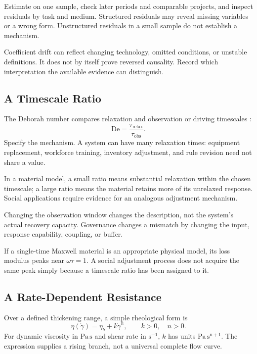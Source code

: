 Estimate on one sample, check later periods and comparable projects, and inspect residuals by task and medium. Structured residuals may reveal missing variables or a wrong form. Unstructured residuals in a small sample do not establish a mechanism.

Coefficient drift can reflect changing technology, omitted conditions, or unstable definitions. It does not by itself prove reversed causality. Record which interpretation the available evidence can distinguish.

\subsection{A Timescale Ratio}

The Deborah number compares relaxation and observation or driving timescales \cite{reiner1964deborah}:
\begin{equation}
 \mathrm{De}=\frac{\tau_{\mathrm{relax}}}
                  {\tau_{\mathrm{obs}}}.
\end{equation}
Specify the mechanism. A system can have many relaxation times: equipment replacement, workforce training, inventory adjustment, and rule revision need not share a value.

In a material model, a small ratio means substantial relaxation within the chosen timescale; a large ratio means the material retains more of its unrelaxed response. Social applications require evidence for an analogous adjustment mechanism.

Changing the observation window changes the description, not the system's actual recovery capacity. Governance changes a mismatch by changing the input, response capability, coupling, or buffer.

If a single-time Maxwell material is an appropriate physical model, its loss modulus peaks near $\omega\tau=1$. A social adjustment process does not acquire the same peak simply because a timescale ratio has been assigned to it.

\subsection{A Rate-Dependent Resistance}

Over a defined thickening range, a simple rheological form is
\begin{equation}
 \eta(\dot\gamma)=\eta_b+k\dot\gamma^n,
 \qquad k>0,\quad n>0.
\end{equation}
For dynamic viscosity in $\mathrm{Pa\,s}$ and shear rate in $\mathrm{s^{-1}}$, $k$ has units $\mathrm{Pa\,s^{n+1}}$. The expression supplies a rising branch, not a universal complete flow curve.

